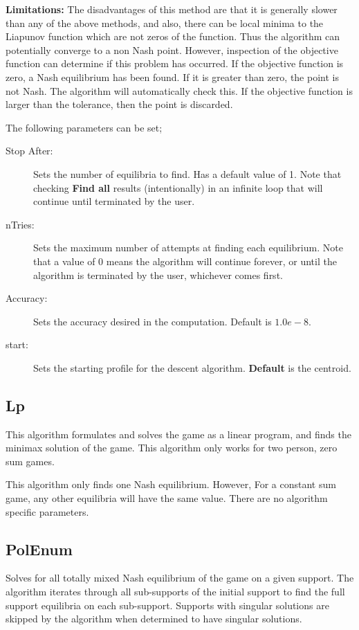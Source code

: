 \documentclass[12pt]{report}
\begin{document}
{\bf Limitations:} The disadvantages of this method are that it is
generally slower than any of the above methods, and also, there can be
local minima to the Liapunov function which are not zeros of the
function.  Thus the algorithm can potentially converge to a non Nash
point.  However, inspection of the objective function can determine if
this problem has occurred.  If the objective function is zero, a Nash
equilibrium has been found. If it is greater than zero, the point is
not Nash.  The algorithm will automatically check this.  If the
objective function is larger than the tolerance, then the point is
discarded.

The following parameters can be set;

\begin{description}
\item[Stop After:] Sets the number of equilibria to find.  Has a
default value of 1. Note that checking {\bf Find all} results
(intentionally) in an infinite loop that will continue until
terminated by the user.
\item[nTries:] Sets the maximum number of attempts at finding each
equilibrium. Note that a value of 0 means the algorithm will continue
forever, or until the algorithm is terminated by the user, whichever
comes first.
\item[Accuracy:] Sets the accuracy desired in the computation.
Default is $1.0e-8.$ 
\item[start:] Sets the starting profile for the descent algorithm.
{\bf Default} is the centroid.
\end{description}

\subsection{Lp}\label{Lp}
This algorithm formulates and solves the game as a linear program, and
finds the minimax solution of the game.  This algorithm only works for
two person, zero sum games.

This algorithm only finds one Nash equilibrium.  However, For a
constant sum game, any other equilibria will have the same value.
There are no algorithm specific parameters.

\subsection{PolEnum}\label{PolEnum}
Solves for all totally mixed Nash equilibrium of the game on a given
support. The algorithm iterates through all sub-supports of the
initial support to find the full support equilibria on each
sub-support.  Supports with singular solutions are skipped by the
algorithm when determined to have singular solutions.
\end{document}

